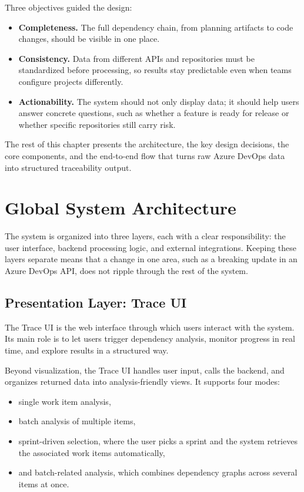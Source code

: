 Three objectives guided the design:

\begin{itemize}
    \item \textbf{Completeness.} The full dependency chain, from planning artifacts to code changes, should be visible in one place.

    \item \textbf{Consistency.} Data from different APIs and repositories must be standardized before processing, so results stay predictable even when teams configure projects differently.

    \item \textbf{Actionability.} The system should not only display data; it should help users answer concrete questions, such as whether a feature is ready for release or whether specific repositories still carry risk.
\end{itemize}

The rest of this chapter presents the architecture, the key design decisions, the core components, and the end-to-end flow that turns raw Azure DevOps data into structured traceability output.

\section{Global System Architecture}
\label{sec:global-architecture}

The system is organized into three layers, each with a clear responsibility: the user interface, backend processing logic, and external integrations. Keeping these layers separate means that a change in one area, such as a breaking update in an Azure DevOps API, does not ripple through the rest of the system.

\subsection{Presentation Layer: Trace UI}

The Trace UI is the web interface through which users interact with the system. Its main role is to let users trigger dependency analysis, monitor progress in real time, and explore results in a structured way.

Beyond visualization, the Trace UI handles user input, calls the backend, and organizes returned data into analysis-friendly views. It supports four modes:

\begin{itemize}
    \item single work item analysis,
    \item batch analysis of multiple items,
    \item sprint-driven selection, where the user picks a sprint and the system retrieves the associated work items automatically,
    \item and batch-related analysis, which combines dependency graphs across several items at once.
\end{itemize}

